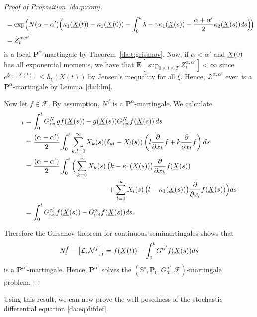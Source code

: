 \begin{proof}[Proof of Proposition~\ref{da:p:com}]
\begin{align*}
&\, = \exp \! \Big( N (\alpha - \alpha') \Big(\kappa_1(\underline{X} \! \left( t \right)) - \kappa_1(\underline{X} \! \left( 0 \right))
		 		- \int_0^t \lambda - \gamma \kappa_1(\underline{X} \! \left( s \right)) - \frac{\alpha + \alpha'}{2}
		 		\kappa_2(\underline{X} \! \left( s \right)) ds \Big)\!\Big) \\
&\, = Z^{\alpha,\alpha'}_t
\end{align*}
is a local $\mathbf{P}^\alpha$-martingale by Theorem~\ref{da:t:grisanov}. Now, if 
$\alpha<\alpha'$ and $\underline{X} \! \left( 0 \right)$ has all exponential moments, we have that $\mathbf
E[\sup_{0\leq t\leq T} Z^{\alpha,\alpha'}_t]<\infty$ since $e^{\xi \kappa_1(\underline X(t))} \leq
h_\xi(\underline X(t))$ by Jensen's inequality for all $\xi$. Hence, $\mathcal Z^{\alpha, \alpha'}$
even is a $\mathbf P^\alpha$-martingale by Lemma~\ref{da:l:lm}.

\noindent
Now let $f \in \mathcal{\overline F}$. By assumption, $N^f$ is a $\mathbf{P}^\alpha$-martingale. 
We calculate
\begin{align*}
[\mathcal L, \mathcal N^f]_t 
& = \int_0^t \GNresFX{gf}{\mrDifT{s}} - g(\mrDifT{s}) \GNresFX{f}{\mrDifT{s}} ds \\ 
& = \frac{(\alpha-\alpha')}{2} \int_0^t \sum_{k,l=0}^\infty X_k(s)(\delta_{kl} -
    X_l(s)) 
    \left( l \frac{\partial}{ \partial x_k} f + k \frac{\partial}{ \partial x_l} f \right)
    ds \\ 
& = \frac{(\alpha-\alpha')}{2} \int_0^t 
 	\Big( 
 		\sum_{k=0}^\infty \mrDifKT{k}{s} \big(k - \kappa_1(\mrDifT{s})\big)
     	\frac{\partial}{\partial x_k} f(\mrDifT{s}) \\
&\qquad \qquad \qquad \qquad \qquad \qquad + 
     	\sum_{l=0}^\infty \mrDifKT{l}{s} \big(l - \kappa_1(\mrDifT{s})\big)
     	\frac{\partial}{\partial x_l} f(\mrDifT{s}) \Big) 
     ds \\
& = \int_0^t \Gsel{\alpha'}f(\mrDifT{s}) - \Gsel{\alpha}f(\mrDifT{s}) ds.
\end{align*}

\noindent
Therefore the Girsanov theorem for continuous semimartingales shows that
\begin{align*}
N_t^f - \left[ \mathcal{L}, \mathcal{N}^f \right]_t 
= f(\underline{X} \! \left( t \right)) - \int_0^t G^{\alpha'} f(\underline{X} \! \left( s \right)) ds
\end{align*}
is a $\mathbf P^{\alpha'}$-martingale. Hence, $\mathbf P^{\alpha'}$ solves
the $(\mathbb S^\circ, \mathbf P_0, G_{\mathcal X}^{\alpha'},\overline{\mathcal F})$-martingale problem.
\end{proof}

\noindent
Using this result, we can now prove the well-posedness of the stochastic
differential equation \eqref{da:eq:difdef}.

